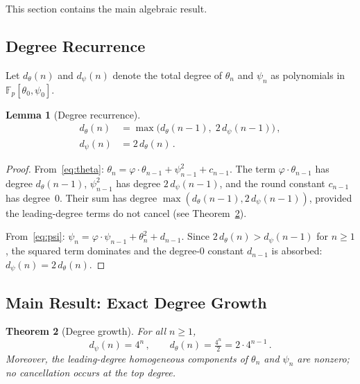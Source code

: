 \documentclass[11pt,a4paper]{article}
\newtheorem{theorem}{Theorem}[section]
\newtheorem{lemma}[theorem]{Lemma}
\theoremstyle{definition}
\newcommand{\Fp}{\mathbb{F}_p}
\begin{document}
This section contains the main algebraic result.

\subsection{Degree Recurrence}\label{sec:degree:recurrence}

Let $d_\theta(n)$ and $d_\psi(n)$ denote the total degree of $\theta_n$ and
$\psi_n$ as polynomials in $\Fp[\theta_0, \psi_0]$.

\begin{lemma}[Degree recurrence]\label{lem:recurrence}
\begin{align}
  d_\theta(n) &= \max\bigl(d_\theta(n-1),\; 2\,d_\psi(n-1)\bigr)\,,
  \label{eq:rec_theta} \\
  d_\psi(n)   &= 2\,d_\theta(n)\,.  \label{eq:rec_psi}
\end{align}
\end{lemma}

\begin{proof}
From~\eqref{eq:theta}: $\theta_n = \varphi\cdot\theta_{n-1} + \psi_{n-1}^2 + c_{n-1}$.
The term $\varphi\cdot\theta_{n-1}$ has degree $d_\theta(n-1)$,
$\psi_{n-1}^2$ has degree $2\,d_\psi(n-1)$, and the round constant $c_{n-1}$
has degree~0. Their sum has degree
$\max(d_\theta(n-1), 2\,d_\psi(n-1))$, provided the leading-degree terms do
not cancel (see Theorem~\ref{thm:degree}).

From~\eqref{eq:psi}: $\psi_n = \varphi\cdot\psi_{n-1} + \theta_n^2 + d_{n-1}$.
Since $2\,d_\theta(n) > d_\psi(n-1)$ for $n \ge 1$, the squared term
dominates and the degree-0 constant $d_{n-1}$ is absorbed:
$d_\psi(n) = 2\,d_\theta(n)$.
\end{proof}


\subsection{Main Result: Exact Degree Growth}\label{sec:degree:main}

\begin{theorem}[Degree growth]\label{thm:degree}
For all $n \ge 1$,
\[
  d_\psi(n) = 4^n\,,\qquad d_\theta(n) = \tfrac{4^n}{2} = 2\cdot 4^{n-1}\,.
\]
Moreover, the leading-degree homogeneous components of $\theta_n$ and
$\psi_n$ are nonzero; no cancellation occurs at the top degree.
\end{theorem}
\end{document}
